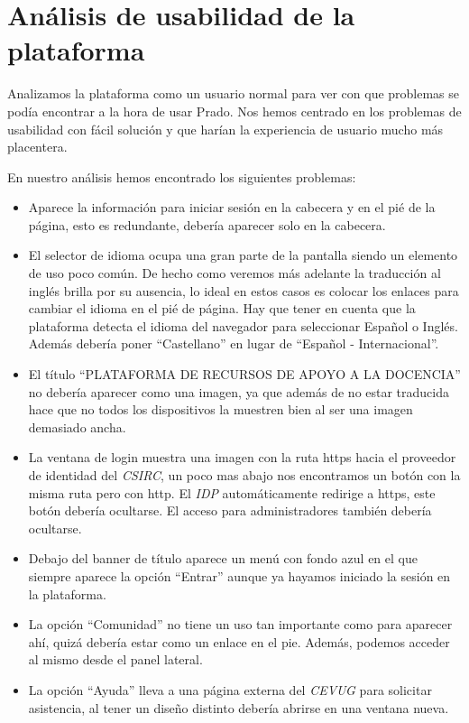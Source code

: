 \section{Análisis de usabilidad de la plataforma}

Analizamos la plataforma como un usuario normal para ver con que problemas se podía encontrar a la hora de usar Prado. Nos hemos centrado en los problemas de usabilidad con fácil solución y que harían la experiencia de usuario mucho más placentera.

\bigskip
En nuestro análisis hemos encontrado los siguientes problemas:

\begin{itemize}

\item Aparece la información para iniciar sesión en la cabecera y en el pié de la página, esto es redundante, debería aparecer solo en la cabecera.
\item El selector de idioma ocupa una gran parte de la pantalla siendo un elemento de uso poco común. De hecho como veremos más adelante la traducción al inglés brilla por su ausencia, lo ideal en estos casos es colocar los enlaces para cambiar el idioma en el pié de página. Hay que tener en cuenta que la plataforma detecta el idioma del navegador para seleccionar Español o Inglés. Además debería poner ``Castellano'' en lugar de ``Español - Internacional''.
\item El título ``PLATAFORMA DE RECURSOS DE APOYO A LA DOCENCIA'' no debería aparecer como una imagen, ya que además de no estar traducida hace que no todos los dispositivos la muestren bien al ser una imagen demasiado ancha.
\item La ventana de login muestra una imagen con la ruta https hacia el proveedor de identidad del \textit{CSIRC}, un poco mas abajo nos encontramos un botón con la misma ruta pero con http. El \textit{IDP} automáticamente redirige a https, este botón debería ocultarse. El acceso para administradores también debería ocultarse.
\item Debajo del banner de título aparece un menú con fondo azul en el que siempre aparece la opción ``Entrar'' aunque ya hayamos iniciado la sesión en la plataforma.
\item La opción ``Comunidad'' no tiene un uso tan importante como para aparecer ahí, quizá debería estar como un enlace en el pie. Además, podemos acceder al mismo desde el panel lateral.
\item La opción ``Ayuda'' lleva a una página externa del \textit{CEVUG} para solicitar asistencia, al tener un diseño distinto debería abrirse en una ventana nueva.

\end{itemize}
